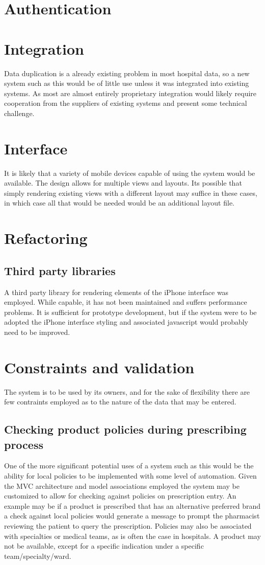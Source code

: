 \documentclass[letterpaper]{amsart}
\begin{document}
\section{Authentication}

\section{Integration}
Data duplication is a already existing problem in most hospital data, so a new system such as this would be of little use unless it was integrated into existing systems.  As most are almost entirely proprietary integration would likely require cooperation from the suppliers of existing systems and present some technical challenge.
\section{Interface}
It is likely that a variety of mobile devices capable of using the system would be available.  The design allows for multiple views and layouts.  Its possible that simply rendering existing views with a different layout may suffice in these cases, in which case all that would be needed would be an additional layout file.
\section{Refactoring}
\subsection{Third party libraries}
A third party library for rendering elements of the iPhone interface was employed.  While capable, it has not been maintained and suffers performance problems.  It is sufficient for prototype development, but if the system were to be adopted the iPhone interface styling and associated javascript would probably need to be improved.
\section{Constraints and validation}
The system is to be used by its owners, and for the sake of flexibility there are few contraints employed as to the nature of the data that may be entered.  
\subsection{Checking product policies during prescribing process}
One of the more significant potential uses of a system such as this would be the ability for local policies to be implemented with some level of automation.  Given the MVC architecture and model associations employed the system may be customized to allow for checking against policies on prescription entry.  An example may be if a product is prescribed that has an alternative preferred brand a check against local policies would generate a message to prompt the pharmacist reviewing the patient to query the prescription.  Policies may also be associated with specialties or medical teams, as is often the case in hospitals.  A product may not be available, except for a specific indication under a specific team/specialty/ward.
\end{document}
